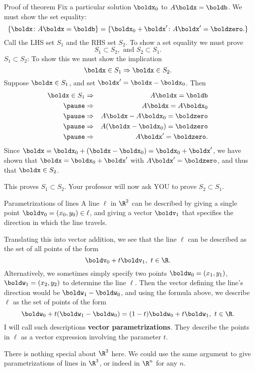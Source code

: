 \begin{frame}{Proof of theorem}
\footnotesize
Fix a particular solution $\boldx_0$ to $A\boldx=\boldb$. 
We must show the \alert{set equality}:
\[
\{\boldx\colon A\boldx=\boldb\}=\{\boldx_0+\boldx'\colon A\boldx'=\boldzero.\}
\]
\pause
Call the LHS set $S_1$ and the RHS set $S_2$. To show a set equality we must prove 
\[
S_1\subset S_2, \text{ and }  S_2\subset S_1.
\]
\pause
\alert{$S_1\subset S_2$:} To show this we must show the implication 
\[
\boldx\in S_1\Rightarrow \boldx\in S_2.
\] 
\pause Suppose $\boldx\in S_1$, and set $\boldx'=\boldx-\boldx_0$. Then 
\begin{eqnarray*}
\boldx\in S_1&\Rightarrow&A\boldx=\boldb \\
\pause &\Rightarrow&A\boldx=A\boldx_0 \\
\pause&\Rightarrow&A\boldx-A\boldx_0=\boldzero \\
\pause&\Rightarrow&A(\boldx-\boldx_0)=\boldzero \\
\pause&\Rightarrow&A\boldx'=\boldzero.
\end{eqnarray*}
\pause Since $\boldx=\boldx_0+(\boldx-\boldx_0)=\boldx_0+\boldx'$, we have shown that $\boldx=\boldx_0+\boldx'$ with $A\boldx'=\boldzero$, and thus that $\boldx\in S_2$. 

\pause This proves $S_1\subset S_2$. Your professor will now ask YOU to prove $S_2\subset S_1$.
\end{frame}
\begin{frame}{Parametrizations of lines}
\footnotesize
A line $\ell$ in $\R^2$ can be described by giving a single point $\boldv_0=(x_0,y_0)\in\ell$, and giving a vector $\boldv_1$ that specifies the direction in which the line travels. 

\bpause 
Translating this into vector addition, we see that the line $\ell$ can be described as the set of all points of the form 
\[
\boldv_0+t\boldv_1, \ t\in\R.
\]
\pause Alternatively, we sometimes simply specify two points $\boldw_0=(x_1,y_1)$, $\boldw_1=(x_2,y_2)$ to determine the line $\ell$. \pause Then the vector defining the line's direction would be $\boldw_1-\boldw_0$, and using the formula above, we describe $\ell$ as the set of points of the form 
\[
\boldw_0+t(\boldw_1-\boldw_0)=(1-t)\boldw_0+t\boldw_1, \ t\in\R.
\]
\pause
I will call such descriptions {\bf vector parametrizations}. They describe the points in $\ell$ as a vector expression involving the parameter $t$. 

\bpause There is nothing special about $\R^2$ here. We could use the same argument to give parametrizations of lines in $\R^3$, or indeed in $\R^n$ for any $n$. 
\end{frame}

